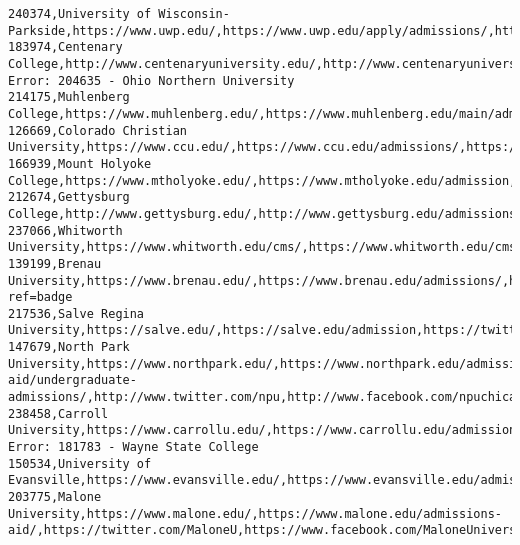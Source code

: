 \documentclass[11pt]{article}
\begin{document}
\begin{Verbatim}[commandchars=\\\{\}]
240374,University of Wisconsin-Parkside,https://www.uwp.edu/,https://www.uwp.edu/apply/admissions/,https://twitter.com/uwparkside,https://www.facebook.com/universityofwisconsinparkside,https://www.instagram.com/uw\_parkside\_admissions/
183974,Centenary College,http://www.centenaryuniversity.edu/,http://www.centenaryuniversity.edu/freshmen/,https://twitter.com/Centenary\_NJ,https://www.facebook.com/centenaryuniversity,https://www.instagram.com/centenaryuniversity
Error: 204635 - Ohio Northern University
214175,Muhlenberg College,https://www.muhlenberg.edu/,https://www.muhlenberg.edu/main/admissions/,http://twitter.com/muhlenberg,http://www.facebook.com/MuhlenbergCollege,https://www.instagram.com/p/BpZzITfnmHZ/
126669,Colorado Christian University,https://www.ccu.edu/,https://www.ccu.edu/admissions/,https://twitter.com/my\_ccu,https://www.facebook.com/myCCU,https://instagram.com/myccu
166939,Mount Holyoke College,https://www.mtholyoke.edu/,https://www.mtholyoke.edu/admission,https://twitter.com/mtholyoke,https://www.facebook.com/mountholyokecollege,https://instagram.com/mtholyoke/
212674,Gettysburg College,http://www.gettysburg.edu/,http://www.gettysburg.edu/admissions/,https://twitter.com/gettysburg,https://www.facebook.com/Gburg.College,http://instagram.com/gettysburgcollege
237066,Whitworth University,https://www.whitworth.edu/cms/,https://www.whitworth.edu/cms/administration/admissions/,https://twitter.com/whitworth,https://www.facebook.com/whitworthuniversity,https://www.instagram.com/whitworthuniversity/
139199,Brenau University,https://www.brenau.edu/,https://www.brenau.edu/admissions/,http://twitter.com/BrenauU,https://www.facebook.com/brenauuniversity,http://instagram.com/brenauuniversity?ref=badge
217536,Salve Regina University,https://salve.edu/,https://salve.edu/admission,https://twitter.com/SalveRegina,http://www.facebook.com/SalveReginaUniversity,http://instagram.com/salveregina/
147679,North Park University,https://www.northpark.edu/,https://www.northpark.edu/admissions-aid/undergraduate-admissions/,http://www.twitter.com/npu,http://www.facebook.com/npuchicago,http://www.instagram.com/npuchicago
238458,Carroll University,https://www.carrollu.edu/,https://www.carrollu.edu/admissions,https://twitter.com/carrollu,https://www.facebook.com/carroll.university,https://www.instagram.com/carrolluniversity
Error: 181783 - Wayne State College
150534,University of Evansville,https://www.evansville.edu/,https://www.evansville.edu/admission/,https://twitter.com/UEvansville,https://www.facebook.com/UniversityofEvansville,http://instagram.com/uevansville
203775,Malone University,https://www.malone.edu/,https://www.malone.edu/admissions-aid/,https://twitter.com/MaloneU,https://www.facebook.com/MaloneUniversity/,https://www.instagram.com/malone\_u/

\end{Verbatim}
\end{document}
